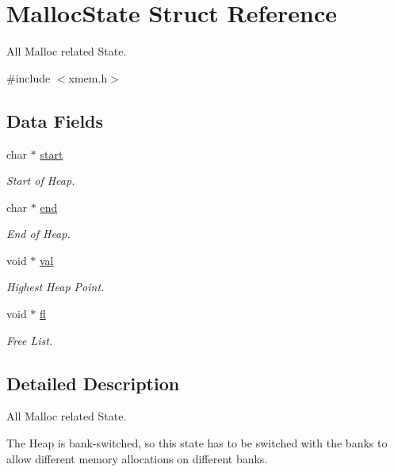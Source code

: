 \hypertarget{struct_malloc_state}{\section{Malloc\-State Struct Reference}
\label{struct_malloc_state}
}


All Malloc related State.  




{\ttfamily \#include $<$xmem.\-h$>$}

\subsection*{Data Fields}
\begin{DoxyCompactItemize}
\item 
char $\ast$ \hyperlink{struct_malloc_state_ab40328f79e021050ac262dc0a6019667}{start}
\begin{DoxyCompactList}\small\item\em Start of Heap. \end{DoxyCompactList}\item 
char $\ast$ \hyperlink{struct_malloc_state_a8fd806ad19b8f5513a4cf18cbf77532c}{end}
\begin{DoxyCompactList}\small\item\em End of Heap. \end{DoxyCompactList}\item 
void $\ast$ \hyperlink{struct_malloc_state_ab03f36f103bdec81305fd301f1f93885}{val}
\begin{DoxyCompactList}\small\item\em Highest Heap Point. \end{DoxyCompactList}\item 
void $\ast$ \hyperlink{struct_malloc_state_a2cd9ff81854efd20b4a1e414ac69f3dc}{fl}
\begin{DoxyCompactList}\small\item\em Free List. \end{DoxyCompactList}\end{DoxyCompactItemize}


\subsection{Detailed Description}
All Malloc related State. 

The Heap is bank-\/switched, so this state has to be switched with the banks to allow different memory allocations on different banks. 

